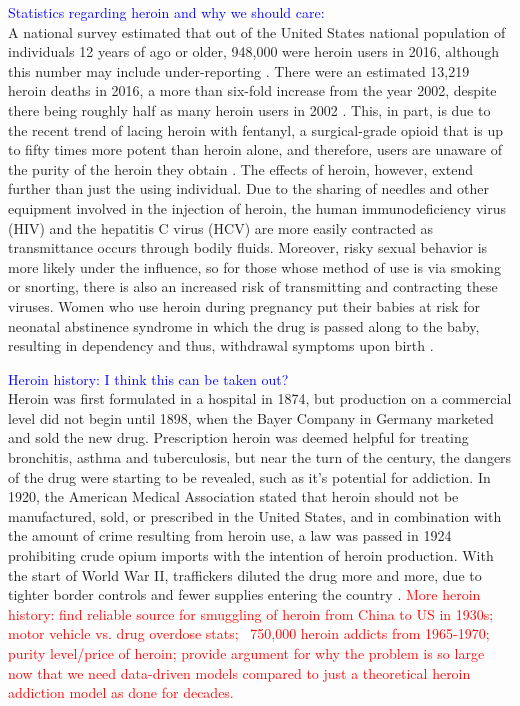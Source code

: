 \documentclass[12pt]{article}
\begin{document}
\textcolor{blue}{Statistics regarding heroin and why we should care:} \\
A national survey estimated that out of the United States national population of individuals 12 years of ago or older, 948,000 were heroin users in 2016, although this number may include under-reporting \cite{CDC2}. There were an estimated 13,219 heroin deaths in 2016, a more than six-fold increase from the year 2002, despite there being roughly half as many heroin users in 2002 \cite{NSDUH1}. This, in part, is due to the recent trend of lacing heroin with fentanyl, a surgical-grade opioid that is up to fifty times more potent than heroin alone, and therefore, users are unaware of the purity of the heroin they obtain \cite{CDC1, NIH2, Volkow2}. The effects of heroin, however, extend further than just the using individual. Due to the sharing of needles and other equipment involved in the injection of heroin, the human immunodeficiency virus (HIV) and the hepatitis C virus (HCV) are more easily contracted as transmittance occurs through bodily fluids. Moreover, risky sexual behavior is more likely under the influence, so for those whose method of use is via smoking or snorting, there is also an increased risk of transmitting and contracting these viruses. Women who use heroin during pregnancy put their babies at risk for neonatal abstinence syndrome in which the drug is passed along to the baby, resulting in dependency and thus, withdrawal symptoms upon birth \cite{NIDA2}. 

\textcolor{blue}{Heroin history: I think this can be taken out?} \\
Heroin was first formulated in a hospital in 1874, but production on a commercial level did not begin until 1898, when the Bayer Company in Germany marketed and sold the new drug. Prescription heroin was deemed helpful for treating bronchitis, asthma and tuberculosis, but near the turn of the century, the dangers of the drug were starting to be revealed, such as it's potential for addiction. In 1920, the American Medical Association stated that heroin should not be manufactured, sold, or prescribed in the United States, and in combination with the amount of crime resulting from heroin use, a law was passed in 1924 prohibiting crude opium imports with the intention of heroin production. With the start of World War II, traffickers diluted the drug more and more, due to tighter border controls and fewer supplies entering the country \cite{UnitedNations}. \textcolor{red}{More heroin history: find reliable source for smuggling of heroin from China to US in 1930s; motor vehicle vs. drug overdose stats; ~750,000 heroin addicts from 1965-1970; purity level/price of heroin; provide argument for why the problem is so large now that we need data-driven models compared to just a theoretical heroin addiction model as done for decades.} 
\end{document}
